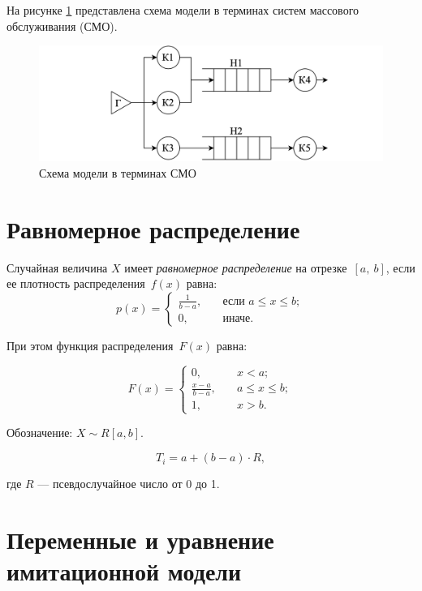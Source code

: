 На рисунке \ref{img:queuingSystems} представлена схема модели в терминах систем массового обслуживания (СМО).

\begin{figure}[ht!]
	\centering
	\includegraphics[width=0.6\linewidth]{img/queuingSystems.png}
	\caption{Схема модели в терминах СМО}
	\label{img:queuingSystems}
\end{figure}

\section {Равномерное распределение}

Случайная величина $X$ имеет \textit{равномерное распределение} на отрезке~$[a,~b]$, если ее плотность распределения~$f(x)$ равна:
\begin{equation}
	p(x) =
	\begin{cases}
		\displaystyle\frac{1}{b - a}, & \quad \text{если } a \leq x \leq b;\\
		0,  & \quad \text{иначе}.
	\end{cases}
\end{equation}

При этом функция распределения~$F(x)$ равна:

\begin{equation}
	F(x) =
	\begin{cases}
		0,  & \quad x < a;\\
		\displaystyle\frac{x - a}{b - a}, & \quad a \leq x \leq b;\\
		1,  & \quad x > b.
	\end{cases}
\end{equation}

Обозначение: $X \sim R[a, b]$.

\begin{equation}
	T_{i} = a + (b - a) \cdot R,
\end{equation}

\noindent где $R$ --- псевдослучайное число от 0 до 1.

\section{Переменные и уравнение имитационной модели}

